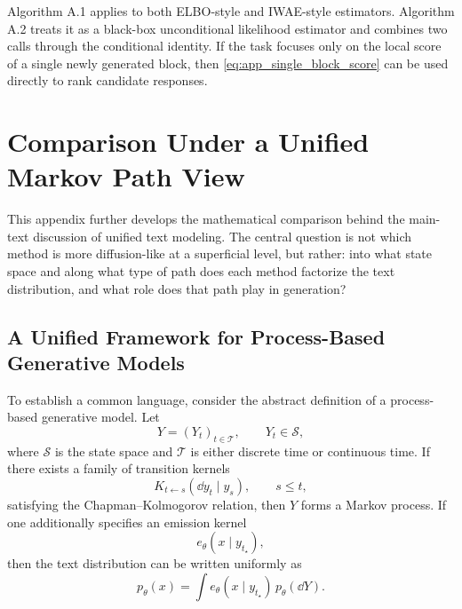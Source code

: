 Algorithm A.1 applies to both ELBO-style and IWAE-style estimators. Algorithm A.2 treats it as a black-box unconditional likelihood estimator and combines two calls through the conditional identity. If the task focuses only on the local score of a single newly generated block, then \eqref{eq:app_single_block_score} can be used directly to rank candidate responses.

\section{Comparison Under a Unified Markov Path View}
\label{app:comparison}

This appendix further develops the mathematical comparison behind the main-text discussion of unified text modeling. The central question is not which method is more diffusion-like at a superficial level, but rather: into what state space and along what type of path does each method factorize the text distribution, and what role does that path play in generation?

\subsection{A Unified Framework for Process-Based Generative Models}
\label{app:unified_process}

To establish a common language, consider the abstract definition of a process-based generative model. Let
\begin{equation}
Y=(Y_t)_{t\in\mathcal T},
\qquad Y_t\in\mathcal S,
\label{eq:app_unified_path_process}
\end{equation}
where $\mathcal S$ is the state space and $\mathcal T$ is either discrete time or continuous time. If there exists a family of transition kernels
\begin{equation}
K_{t\leftarrow s}(\dd y_t\mid y_s),
\qquad s\le t,
\label{eq:app_unified_transition_kernel}
\end{equation}
satisfying the Chapman--Kolmogorov relation, then $Y$ forms a Markov process. If one additionally specifies an emission kernel
\begin{equation}
e_{\theta}(x\mid y_{t_\star}),
\label{eq:app_unified_emission}
\end{equation}
then the text distribution can be written uniformly as
\begin{equation}
p_{\theta}(x)=\int e_{\theta}(x\mid y_{t_\star})\,p_{\theta}(\dd Y).
\label{eq:app_unified_path_marginal}
\end{equation}

